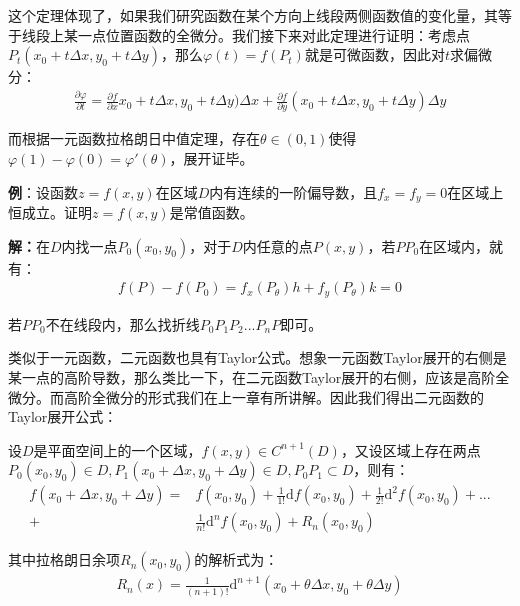 \documentclass{ctexart}
\let\oldtextbf\textbf %
\renewcommand{\textbf}[1]{\textcolor{btex}{\oldtextbf{#1}}} %
\begin{document}
这个定理体现了，如果我们研究函数在某个方向上线段两侧函数值的变化量，其等于线段上某一点位置函数的全微分。我们接下来对此定理进行证明：考虑点$P_t(x_0+t\Delta x,y_0+t\Delta y)$，那么$\varphi(t)=f(P_t)$就是可微函数，因此对$t$求偏微分：
\begin{align*}
    \frac{\partial \varphi}{\partial t}=\frac{\partial f}{\partial x}x_0+ t\Delta x,y_0+t\Delta y)\Delta x+\frac{\partial f}{\partial y}(x_0+t\Delta x,y_0+t\Delta y)\Delta y
\end{align*}

而根据一元函数拉格朗日中值定理，存在$\theta\in(0,1)$使得$\varphi(1)-\varphi(0)=\varphi'(\theta)$，展开证毕。

\textbf{例}：设函数$z=f(x,y)$在区域$D$内有连续的一阶偏导数，且$f_x=f_y=0$在区域上恒成立。证明$z=f(x,y)$是常值函数。

\textbf{解：}在$D$内找一点$P_0(x_0,y_0)$，对于$D$内任意的点$P(x,y)$，若$PP_0$在区域内，就有：
\begin{align*}
    f(P)-f(P_0)=f_x(P_\theta)h+f_y(P_\theta)k=0
\end{align*}

若$PP_0$不在线段内，那么找折线$P_0P_1P_2...P_nP$即可。

类似于一元函数，二元函数也具有Taylor公式。想象一元函数Taylor展开的右侧是某一点的高阶导数，那么类比一下，在二元函数Taylor展开的右侧，应该是高阶全微分。而高阶全微分的形式我们在上一章有所讲解。因此我们得出二元函数的Taylor展开公式：
\begin{tcolorbox}[
    colback=bac1,     %
    colframe=fra1,   %
    coltitle=white,             %
    coltext=tex1,
    title=二元函数的Taylor展开,
    fonttitle=\bfseries,        %
arc=3mm,                     %
breakable
]
设$D$是平面空间上的一个区域，$f(x,y)\in C^{n+1}(D)$，又设区域上存在两点$P_0(x_0,y_0)\in D,P_1(x_0+\Delta x,y_0+\Delta y)\in D,P_0P_1\subset D$，则有：
\begin{align*}
    f(x_0+\Delta x,y_0+\Delta y)=&f(x_0,y_0)+\frac{1}{1!}\mathrm{d}f(x_0,y_0)+\frac{1}{2!}\mathrm{d}^2f(x_0,y_0)+...\\
    +&\frac{1}{n!}\mathrm{d}^nf(x_0,y_0)+R_n(x_0,y_0)\tag{7-12}
\end{align*}

其中拉格朗日余项$R_n(x_0,y_0)$的解析式为：
\begin{align*}
    R_n(x)=\frac{1}{(n+1)!}\mathrm{d}^{n+1}(x_0+\theta\Delta x,y_0+\theta\Delta y)\tag{7-13}
\end{align*}
\end{tcolorbox}
\end{document}
